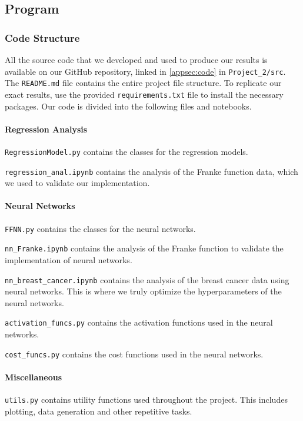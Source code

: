 \subsection{Program}\label{sec:program}
\subsubsection{Code Structure}\label{subsec:codestructure}
All the source code that we developed and used to produce our results is available on our GitHub repository, linked in \cref{appsec:code} in \verb|Project_2/src|. The \verb|README.md| file contains the entire project file structure. To replicate our exact results, use the provided \verb|requirements.txt| file to install the necessary packages. Our code is divided into the following files and notebooks.

\paragraph*{Regression Analysis}
\verb|RegressionModel.py| contains the classes for the regression models.

\verb|regression_anal.ipynb| contains the analysis of the Franke function data, which we used to validate our implementation.

\paragraph*{Neural Networks}
\verb|FFNN.py| contains the classes for the neural networks.

\verb|nn_Franke.ipynb| contains the analysis of the Franke function to validate the implementation of neural networks.

\verb|nn_breast_cancer.ipynb| contains the analysis of the breast cancer data using neural networks. This is where we truly optimize the hyperparameters of the neural networks.

\verb|activation_funcs.py| contains the activation functions used in the neural networks.

\verb|cost_funcs.py| contains the cost functions used in the neural networks.

\paragraph*{Miscellaneous}
\verb|utils.py| contains utility functions used throughout the project. This includes plotting, data generation and other repetitive tasks.

